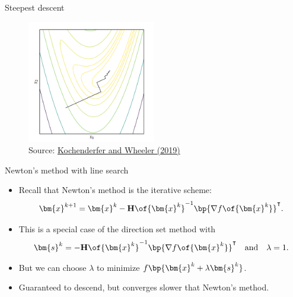 \documentclass[11pt,xcolor={dvipsnames},aspectratio=159,hyperref={pdftex,pdfpagemode=UseNone,hidelinks,pdfdisplaydoctitle=true},usepdftitle=false]{beamer}
\begin{document}
    \begin{frame}{Steepest descent}
        \centering
        \begin{figure}

        \includegraphics[width=0.5\textwidth]{gradientdescent.png}
        \caption{Source: \href{https://mitpress.mit.edu/9780262039420/}{Kochenderfer and Wheeler (2019)}}
        \end{figure}

    \end{frame}  

    \begin{frame}{Newton's method with line search}
        \begin{itemize}
            \item Recall that Newton's method is the iterative scheme: $$\bm{x}^{k+1} = \bm{x}^k - \mathbf{H}\of{\bm{x}^k}^{-1} \bp{\nabla f\of{\bm{x}^k}}^\intercal.$$
            \item This is a special case of the direction set method with 
            \begin{align*}
                \bm{s}^k = - \mathbf{H}\of{\bm{x}^k}^{-1} \bp{\nabla f\of{\bm{x}^k}}^\intercal \quad \text{and} \quad \lambda=1.
            \end{align*}
            \item But we can choose $\lambda$ to minimize $f\bp{\bm{x}^k + \lambda \bm{s}^k}$.
            \item Guaranteed to descend, but converges slower that Newton's method.
            \end{itemize}

    \end{frame}
\end{document}
